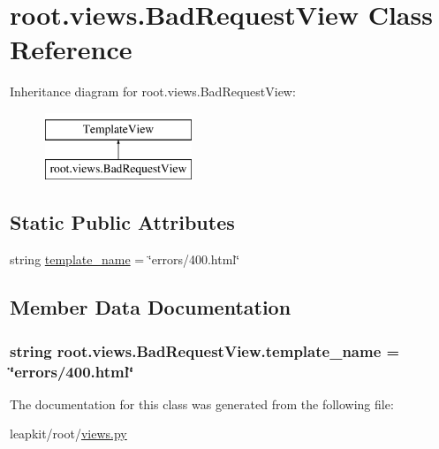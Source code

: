 \hypertarget{classroot_1_1views_1_1_bad_request_view}{\section{root.\-views.\-Bad\-Request\-View Class Reference}
\label{classroot_1_1views_1_1_bad_request_view}
}
Inheritance diagram for root.\-views.\-Bad\-Request\-View\-:\begin{figure}[H]
\begin{center}
\leavevmode
\includegraphics[height=2.000000cm]{classroot_1_1views_1_1_bad_request_view}
\end{center}
\end{figure}
\subsection*{Static Public Attributes}
\begin{DoxyCompactItemize}
\item 
string \hyperlink{classroot_1_1views_1_1_bad_request_view_a0e2985faba86cb03e3ee0f059f38546b}{template\-\_\-name} = \char`\"{}errors/400.html\char`\"{}
\end{DoxyCompactItemize}


\subsection{Member Data Documentation}
\hypertarget{classroot_1_1views_1_1_bad_request_view_a0e2985faba86cb03e3ee0f059f38546b}{
\subsubsection[{template\-\_\-name}]{\setlength{\rightskip}{0pt plus 5cm}string root.\-views.\-Bad\-Request\-View.\-template\-\_\-name = \char`\"{}errors/400.html\char`\"{}\hspace{0.3cm}{\ttfamily [static]}}}\label{classroot_1_1views_1_1_bad_request_view_a0e2985faba86cb03e3ee0f059f38546b}


The documentation for this class was generated from the following file\-:\begin{DoxyCompactItemize}
\item 
leapkit/root/\hyperlink{root_2views_8py}{views.\-py}\end{DoxyCompactItemize}
